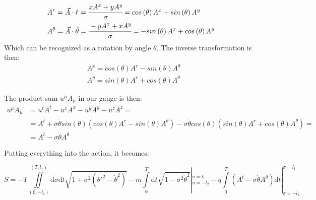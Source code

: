 \documentclass[11pt,a4paper]{article}
\begin{document}
\begin{align*}
&A^{r}=\vec{A}\cdot\hat{r}=\cfrac{xA^{x}+yA^{y}}{\sigma}=cos\left(\theta\right)A^{x}+sin\left(\theta\right)A^{y}\\
&A^{\theta}=\vec{A}\cdot\hat{\theta}=\cfrac{-yA^{x}+xA^{y}}{\sigma}=-sin\left(\theta\right)A^{x}+cos\left(\theta\right)A^{y}
\end{align*}
Which can be recognized as a rotation by angle $\theta$. The inverse transformation is then:
\begin{align*}
&A^{x}=cos\left(\theta\right)A^{r}-sin\left(\theta\right)A^{\theta}\\
&A^{y}=sin\left(\theta\right)A^{r}+cos\left(\theta\right)A^{\theta}
\end{align*}

The product-sum $ u^{\mu}A_{\mu} $ in our gauge is then:
\begin{align*}
u^{\mu}A_{\mu}&=u^{t}A^{t}-u^{x}A^{x}-u^{y}A^{y}-u^{z}A^{z}=\\
&=A^{t}+\sigma\dot{\theta}sin\left(\theta\right)\left(cos\left(\theta\right)A^{r}-sin\left(\theta\right)A^{\theta}\right)
-\sigma\dot{\theta}cos\left(\theta\right)\left(sin\left(\theta\right)A^{r}
+cos\left(\theta\right)A^{\theta}\right)=\\
&=A^{t}-\sigma\dot{\theta}A^{\theta}
\end{align*}

Putting everything into the action, it becomes:

\begin{equation}
\label{eq:actiongauged}
S=-T\iint\limits_{(0,-l_{2})}^{(T,l_{1})} \mathrm{d}\sigma  \mathrm{d}t\sqrt{1+\sigma^{2}\left(\theta'^{2}-\dot{\theta}^{2}\right)}-m\int\limits_0^T  \mathrm{d}t\sqrt{1-\sigma^{2}\dot{\theta}^{2}}|_{\sigma=-l_{2}}^{\sigma=l_{1}}-q\int\limits_{0}^{T}\left(A^{t}-\sigma\dot{\theta}A^{\theta}\right) \mathrm{d}	t|_{\sigma=-l_{2}}^{\sigma=l_{1}}
\end{equation}
\end{document}
